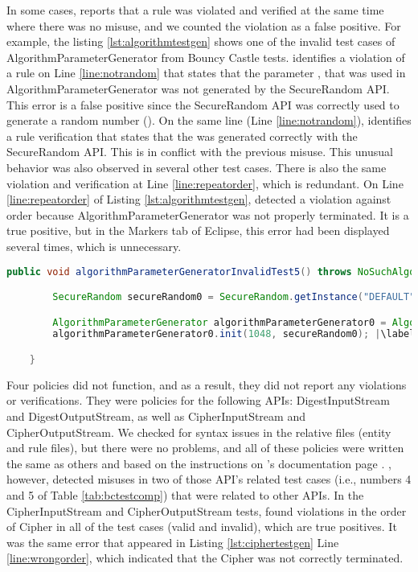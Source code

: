 In some cases, \codyze{} reports that a rule was violated and verified at the same time where there was no misuse, and we counted the violation as a false positive. For example, the listing \ref{lst:algorithmtestgen} shows one of the invalid test cases of AlgorithmParameterGenerator from Bouncy Castle tests. \codyze{} identifies a violation of a rule on Line \ref{line:notrandom} that states that the parameter , that was used in AlgorithmParameterGenerator was not generated by the SecureRandom API. This error is a false positive since the SecureRandom API was correctly used to generate a random number (). On the same line (Line \ref{line:notrandom}), \codyze{} identifies a rule verification that states that the  was generated correctly with the SecureRandom API. This is in conflict with the previous misuse. This unusual behavior was also observed in several other test cases.
There is also the same violation and verification at Line \ref{line:repeatorder}, which is redundant. On Line \ref{line:repeatorder} of Listing \ref{lst:algorithmtestgen}, \codyze{} detected a violation against order because AlgorithmParameterGenerator was not properly terminated. It is a true positive, but in the Markers tab of Eclipse, this error had been displayed several times, which is unnecessary.



\begin{lstlisting}[language=Java, caption=One of the invalid test cases for the AlgorithmParameterGenerator API that \cognicrypttestgen{} generated from the original \crysl{} JCA ruleset., label={lst:algorithmtestgen}, escapechar=|]
	public void algorithmParameterGeneratorInvalidTest5() throws NoSuchAlgorithmException {

		SecureRandom secureRandom0 = SecureRandom.getInstance("DEFAULT");|\label{line:notrandom}|

		AlgorithmParameterGenerator algorithmParameterGenerator0 = AlgorithmParameterGenerator.getInstance("AES");
		algorithmParameterGenerator0.init(1048, secureRandom0); |\label{line:repeatorder}|

	}
\end{lstlisting}


Four \MARK{} policies did not function, and as a result, they did not report any violations or verifications. They were \MARK{} policies for the following APIs: DigestInputStream and DigestOutputStream, as well as CipherInputStream and CipherOutputStream. We checked for syntax issues in the relative files (entity and rule files), but there were no problems, and all of these policies were written the same as others and based on the instructions on \codyze's documentation page \cite{cod}. \codyze, however, detected misuses in two of those API's related test cases (i.e., numbers 4 and 5 of Table \ref{tab:bctestcomp}) that were related to other APIs. In the CipherInputStream and CipherOutputStream tests, \codyze{} found violations in the order of Cipher in all of the test cases (valid and invalid), which are true positives. It was the same error that appeared in Listing \ref{lst:ciphertestgen} Line \ref{line:wrongorder}, which indicated that the Cipher was not correctly terminated.

